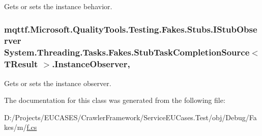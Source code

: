 Gets or sets the instance behavior.

\hypertarget{class_system_1_1_threading_1_1_tasks_1_1_fakes_1_1_stub_task_completion_source_3_01_t_result_01_4_a3e0ef033d985503e726425da82cca551}{
\subsubsection[{Instance\-Observer}]{\setlength{\rightskip}{0pt plus 5cm}mqttf.\-Microsoft.\-Quality\-Tools.\-Testing.\-Fakes.\-Stubs.\-I\-Stub\-Observer System.\-Threading.\-Tasks.\-Fakes.\-Stub\-Task\-Completion\-Source$<$ T\-Result $>$.Instance\-Observer\hspace{0.3cm}{\ttfamily [get]}, {\ttfamily [set]}}}\label{class_system_1_1_threading_1_1_tasks_1_1_fakes_1_1_stub_task_completion_source_3_01_t_result_01_4_a3e0ef033d985503e726425da82cca551}


Gets or sets the instance observer.



The documentation for this class was generated from the following file\-:\begin{DoxyCompactItemize}
\item 
D\-:/\-Projects/\-E\-U\-C\-A\-S\-E\-S/\-Crawler\-Framework/\-Service\-E\-U\-Cases.\-Test/obj/\-Debug/\-Fakes/m/\hyperlink{m_2f_8cs}{f.\-cs}\end{DoxyCompactItemize}
